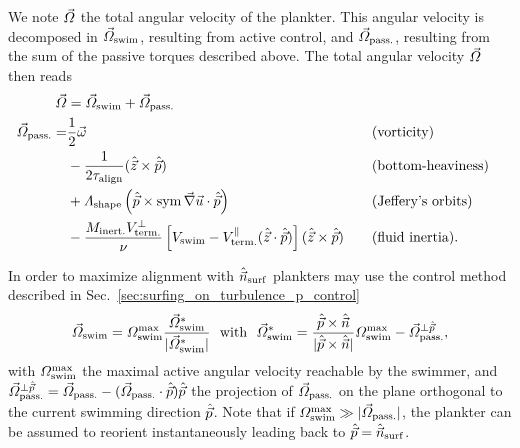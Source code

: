 We note $\vec{\varOmega}$ the total angular velocity of the plankter.
This angular velocity is decomposed in $\vec{\varOmega}_{\mathrm{swim}}$, resulting from active control, and $\vec{\varOmega}_{\mathrm{pass.}}$, resulting from the sum of the passive torques described above.
The total angular velocity $\vec{\varOmega}$ then reads
\begin{subequations}
	\begin{align}
		\vec{\varOmega} &= \vec{\varOmega}_{\mathrm{swim}} + \vec{\varOmega}_{\mathrm{pass.}}\\
		\vec{\varOmega}_{\mathrm{pass.}} = &\frac{1}{2} \vec{\omega} \quad &&\text{(vorticity)}\\ 
		&- \frac{1}{2\tau_{\mathrm{align}}} (\hat{\vec{z}} \times \hat{\vec{p}}) \quad &&\text{(bottom-heaviness)}\\ 
		&+\varLambda_{\mathrm{shape}} \left( \hat{\vec{p}} \times \operatorname{sym} \vec{\nabla} \vec{u} \cdot \hat{\vec{p}} \right) \quad &&\text{(Jeffery's orbits)}\\
		&-\frac{M_{\mathrm{inert.}} V_{\mathrm{term.}}^\perp}{\nu} \left[ V_{\mathrm{swim}} - V_{\mathrm{term.}}^\parallel (\hat{\vec{z}} \cdot \hat{\vec{p}}) \right] (\hat{\vec{z}} \times \hat{\vec{p}}) \quad &&\text{(fluid inertia)}.
	\end{align}
\end{subequations}

In order to maximize alignment with $\hat{\vec{n}}_{\mathrm{surf}}$ plankters may use the control method described in Sec.~\ref{sec:surfing_on_turbulence_p_control}
\begin{equation}
	\label{turb:eq:control_solution}
	\vec{\varOmega}_{\mathrm{swim}} = \varOmega_{\mathrm{swim}}^{\max} \frac{\vec{\varOmega}_{\mathrm{swim}}^*}{\lvert\vec{\varOmega}_{\mathrm{swim}}^*\rvert} ~ \text{ with } ~ \vec{\varOmega}_{\mathrm{swim}}^* = \frac{\hat{\vec{p}} \times \hat{\vec{n}}}{\lvert\hat{\vec{p}} \times \hat{\vec{n}}\rvert} \varOmega_{\mathrm{swim}}^{\max} - \vec{\varOmega}_{\mathrm{pass.}}^{\perp \hat{\vec{p}}},
\end{equation}
with $\varOmega_{\mathrm{swim}}^{\max}$ the maximal active angular velocity reachable by the swimmer, and $\vec{\varOmega}_{\mathrm{pass.}}^{\perp \hat{\vec{p}}} = \vec{\varOmega}_{\mathrm{pass.}} - ( \vec{\varOmega}_{\mathrm{pass.}} \cdot \hat{\vec{p}} ) \hat{\vec{p}}$ the projection of $\vec{\varOmega}_{\mathrm{pass.}}$ on the plane orthogonal to the current swimming direction $\hat{\vec{p}}$.
Note that if $\varOmega_{\mathrm{swim}}^{\max} \gg \lvert\vec{\varOmega}_{\mathrm{pass.}}\rvert$, the plankter can be assumed to reorient instantaneously leading back to $\hat{\vec{p}} = \hat{\vec{n}}_{\mathrm{surf}}$.

